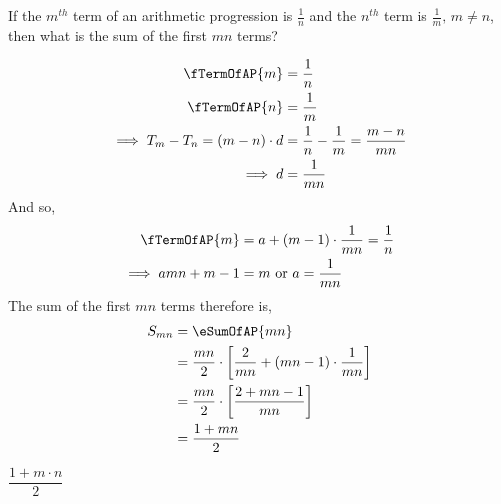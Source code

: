 

\question[3] If the $m^{th}$ term of an arithmetic progression is $\frac{1}{n}$ 
and the $n^{th}$ term is $\frac{1}{m},\,m\neq n$, then what is the sum of the first $mn$ terms? 

\begin{solution}[\halfpage]
	\begin{align}
		\fTermOfAP{m} &= \frac{1}{n} \\
		\fTermOfAP{n} &= \frac{1}{m} \\
		\implies T_m - T_n = (m-n)\cdot d &= \frac{1}{n}-\frac{1}{m} = \dfrac{m-n}{mn} \\
		\implies d &= \dfrac{1}{mn}
	\end{align}
	And so,
	\begin{align}
		\fTermOfAP{m} &= a + (m-1)\cdot\dfrac{1}{mn} = \dfrac{1}{n} \\
		\implies amn + m - 1 &= m \text{ or } a = \dfrac{1}{mn}
	\end{align}
	The sum of the first $mn$ terms therefore is,
	\begin{align}
		S_{mn} &= \eSumOfAP{mn} \\
    &= \dfrac{mn}{2}\cdot\left[ \dfrac{2}{mn} + (mn-1)\cdot\dfrac{1}{mn}\right] \\
		&= \dfrac{mn}{2}\cdot\left[ \dfrac{2 + mn - 1}{mn} \right]  \\
    &= \dfrac{1+mn}{2} 
	\end{align}
\end{solution}
\ifprintanswers\begin{codex}$\dfrac{1+m\cdot n}{2}$\end{codex}\fi
